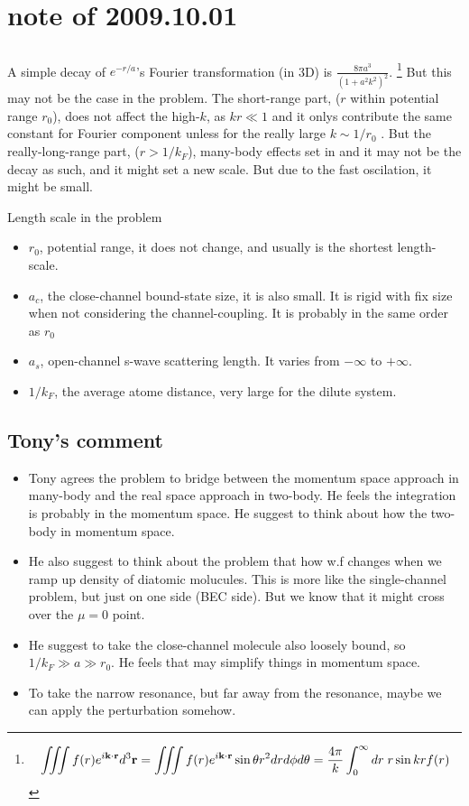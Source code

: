 \section{note of 2009.10.01}
\subsection{}
A simple decay of $e^{-r/a}$'s Fourier transformation (in 3D) is $\frac{8\pi{} a^3 }{\left(1+a^2 k^2\right)^2}$.  
\footnote{
\begin{equation}\label{eq:3dFourier}
\iiint{f(r)e^{i\ensuremath{\mathbf{k}}\cdot\ensuremath{\mathbf{r}}}d^3\ensuremath{\mathbf{r}}}=\iiint{f(r)e^{i\ensuremath{\mathbf{k}}\cdot\ensuremath{\mathbf{r}}}\sin\theta{r^2}drd\phi{d}\theta}=\frac{4\pi}{k}\int_0^{\infty}dr\;r\sin{kr}f(r)
\end{equation} 
}%
But this may not be the case in the problem.  The short-range part, ($r$ within potential range $r_0$), does not affect the high-$k$, as $kr\ll1$ and it onlys contribute the same constant for Fourier component unless for the really large $k\sim{1/r_0}$ .  But the really-long-range part, ($r>1/k_F$), many-body effects set in and it may not be the decay as such, and it might set a new scale.  But due to the fast oscilation, it might be small.

Length scale in the problem
\begin{itemize}
	\item $r_0$, potential range, it does not change, and usually is the shortest length-scale. 
	\item $a_c$, the close-channel bound-state size, it is also small.  It is rigid with fix size when not considering the channel-coupling.  It is probably in the same order as $r_0$
	\item $a_s$, open-channel s-wave scattering length. It varies from $-\infty$ to $+\infty$.
	\item $1/k_F$, the average atome distance, very large for the dilute system.  
\end{itemize}
\subsection{Tony's comment}
\begin{itemize}
\item Tony agrees the problem to bridge between the momentum space approach in many-body and the real space approach in two-body.  He feels the integration is probably in the momentum space.  He suggest to think about how the two-body in momentum space.  
\item He also suggest to think about the problem that how w.f changes when we ramp up density of diatomic molucules.  This is more like the single-channel problem, but just on one side (BEC side).  But we know that it might cross over the $\mu=0$ point.  
\item He suggest to take the close-channel molecule also loosely bound, so $1/k_F\gg{a}\gg{r_0}$.  He feels that may simplify things in momentum space. 
\item To take the narrow resonance, but far away from the resonance, maybe we can apply the perturbation somehow.  
\end{itemize}

